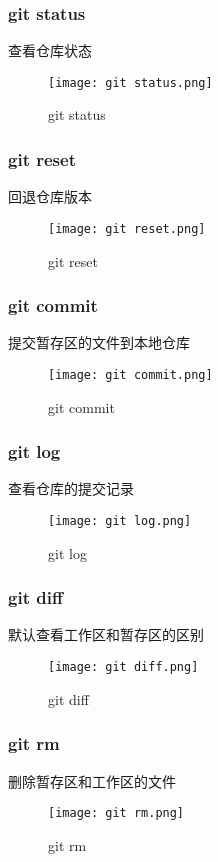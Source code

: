 \documentclass{ctexart}
\begin{document}
\subsubsection{git status}
查看仓库状态\\
\begin{figure}[h]    
    \centering
    \texttt{[image: git status.png]}
    \caption{git status}
    \label{fig:enter-label}
\end{figure}

\subsubsection{git reset}
回退仓库版本\\
\begin{figure}[h]
    \centering
    \texttt{[image: git reset.png]}
    \caption{git reset}
    \label{fig:enter-label}
\end{figure}

\subsubsection{git commit}
提交暂存区的文件到本地仓库
\begin{figure}[h]
    \centering
    \texttt{[image: git commit.png]}
    \caption{git commit}
    \label{fig:enter-label}
\end{figure}


\subsubsection{git log}
查看仓库的提交记录
\begin{figure}[h]
    \centering
    \texttt{[image: git log.png]}
    \caption{git log}
    \label{fig:enter-label}
\end{figure}

\subsubsection{git diff}
默认查看工作区和暂存区的区别
\begin{figure}[h]
    \centering
    \texttt{[image: git diff.png]}
    \caption{git diff}
    \label{fig:enter-label}
\end{figure}

\subsubsection{git rm}
删除暂存区和工作区的文件
\begin{figure}[H]
    \centering
    \texttt{[image: git rm.png]}
    \caption{git rm}
    \label{fig:enter-label}
\end{figure}
\end{document}
